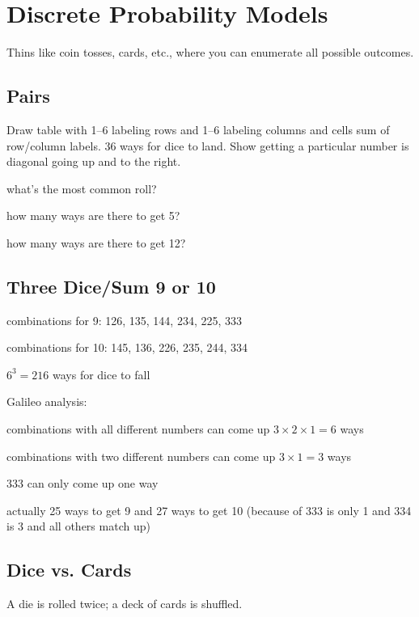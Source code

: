 \documentclass[letterpaper, landscape]{exam}
\begin{document}
  \section{Discrete Probability Models}
  Thins like coin tosses, cards, etc., where you can enumerate all possible
  outcomes.

  \subsection{Pairs}
  Draw table with 1--6 labeling rows and 1--6 labeling columns and cells sum of
  row/column labels. 36 ways for dice to land. Show getting a particular number
  is diagonal going up and to the right.

  \begin{itemize*}
    \item what's the most common roll?
    \item how many ways are there to get 5?
    \item how many ways are there to get 12?
  \end{itemize*}

  \subsection{Three Dice/Sum 9 or 10}

  \begin{itemize*}
    \item combinations for 9: 126, 135, 144, 234, 225, 333
    \item combinations for 10: 145, 136, 226, 235, 244, 334
    \item $6^3 = 216$ ways for dice to fall
  \end{itemize*}

  Galileo analysis:
  \begin{itemize*}
    \item combinations with all different numbers can come up 
      $3 \times 2 \times 1 = 6$ ways
    \item combinations with two different numbers can come up 
      $3 \times 1 = 3$ ways
    \item 333 can only come up one way
    \item actually 25 ways to get 9 and 27 ways to get 10 
      (because of 333 is only 1 and 334 is 3 and all others match up)
  \end{itemize*}

  \subsection{Dice vs. Cards}
  A die is rolled twice; a deck of cards is shuffled.
\end{document}
